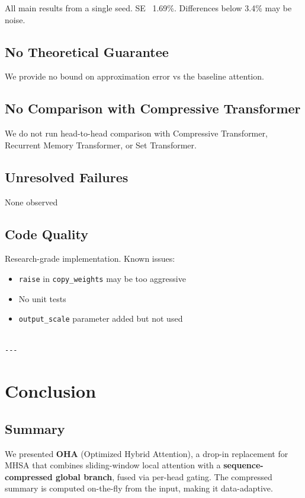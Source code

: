 All main results from a single seed. SE ~1.69\%. Differences below 3.4\% 
may be noise.

\subsection{No Theoretical Guarantee}

We provide no bound on approximation error vs the baseline attention.

\subsection{No Comparison with Compressive Transformer}

We do not run head-to-head comparison with Compressive Transformer, 
Recurrent Memory Transformer, or Set Transformer.

\subsection{Unresolved Failures}

None observed

\subsection{Code Quality}

Research-grade implementation. Known issues:

\begin{itemize}
\item \texttt{raise} in \texttt{copy\_weights} may be too aggressive
\item No unit tests
\item \texttt{output\_scale} parameter added but not used
\end{itemize}
\begin{lstlisting}

---
\end{lstlisting}


\section{Conclusion}

\subsection{Summary}

We presented \textbf{OHA} (Optimized Hybrid Attention), a drop-in replacement 
for MHSA that combines sliding-window local attention with a 
\textbf{sequence-compressed global branch}, fused via per-head gating. The 
compressed summary is computed on-the-fly from the input, making it 
data-adaptive.

